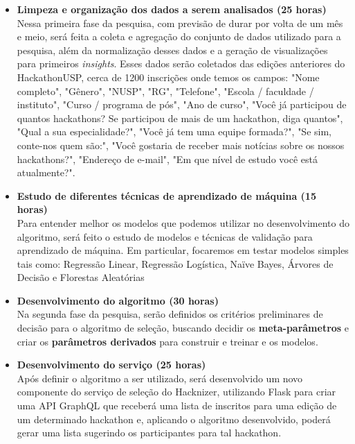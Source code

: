 \documentclass[10pt,twoside,a4paper]{article}
\begin{document}
  \begin{itemize}
    \item \textbf{Limpeza e organização dos dados a serem analisados (25 horas)} \\
        Nessa primeira fase da pesquisa, com previsão de durar por volta de um mês e meio, será feita a coleta e agregação do conjunto de dados utilizado para a pesquisa, além da normalização desses dados e a geração de visualizações para primeiros \textit{insights}. Esses dados serão coletados das edições anteriores do HackathonUSP, cerca de 1200 inscrições onde temos os campos: "Nome completo", "Gênero", "NUSP", "RG", "Telefone", "Escola / faculdade / instituto", "Curso / programa de pós", "Ano de curso", "Você já participou de quantos hackathons? Se participou de mais de um hackathon, diga quantos", "Qual a sua especialidade?", "Você já tem uma equipe formada?", "Se sim, conte-nos quem são:", "Você gostaria de receber mais notícias sobre os nossos hackathons?", "Endereço de e-mail", "Em que nível de estudo você está atualmente?".
    
    \item \textbf{Estudo de diferentes técnicas de aprendizado de máquina (15 horas)} \\
        Para entender melhor os modelos que podemos utilizar no desenvolvimento do algoritmo, será feito o estudo de modelos e técnicas de validação para aprendizado de máquina. Em particular, focaremos em testar modelos simples tais como: Regressão Linear, Regressão Logística, Naïve Bayes, Árvores de Decisão e Florestas Aleatórias 
    
    \item \textbf{Desenvolvimento do algoritmo (30 horas)} \\
        Na segunda fase da pesquisa, serão definidos os critérios preliminares de decisão para o algoritmo de seleção, buscando decidir os \textbf{meta-parâmetros} e criar os \textbf{parâmetros derivados} para construir e treinar e os modelos.
          
    \item \textbf{Desenvolvimento do serviço (25 horas)} \\
        Após definir o algoritmo a ser utilizado, será desenvolvido um novo componente do serviço de seleção do Hacknizer, utilizando Flask para criar uma API GraphQL  que receberá uma lista de inscritos para uma edição de um determinado hackathon e, aplicando o algoritmo desenvolvido, poderá gerar uma lista sugerindo os participantes para tal hackathon. 
    

\end{itemize}
\end{document}
